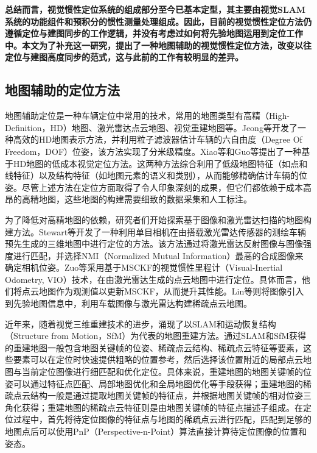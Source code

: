 \textbf{总结而言，视觉惯性定位系统的组成部分至今已基本定型，其主要由视觉SLAM系统的功能组件和预积分的惯性测量处理组成。因此，目前的视觉惯性定位方法仍遵循定位与建图同步的工作逻辑，并没有考虑过如何将先验地图运用到定位工作中。本文为了补充这一研究，提出了一种地图辅助的视觉惯性定位方法，改变以往定位与建图高度同步的范式，这与此前的工作有较明显的差异。}

\subsection{地图辅助的定位方法}
地图辅助定位是一种车辆定位中常用的技术，常用的地图类型有高精（High-Definition，HD）地图、激光雷达点云地图、视觉重建地图等。Jeong等\cite{jeong2020hdmi}开发了一种高效的HD地图表示方法，并利用粒子滤波器估计车辆的六自由度（Degree Of Freedom，DOF）位姿，该方法实现了分米级精度。Xiao等\cite{xiao2020monocular}和Guo等\cite{guo2021coarse}提出了一种基于HD地图的低成本视觉定位方法。这两种方法综合利用了低级地图特征（如点和线特征）以及结构特征（如地图元素的语义和类别），从而能够精确估计车辆的位姿。尽管上述方法在定位方面取得了令人印象深刻的成果，但它们都依赖于成本高昂的高精地图，这些地图的构建需要细致的数据采集和人工标注。

为了降低对高精地图的依赖，研究者们开始探索基于图像和激光雷达扫描的地图构建方法。Stewart等\cite{stewart2012laps}开发了一种利用单目相机在由搭载激光雷达传感器的测绘车辆预先生成的三维地图中进行定位的方法。该方法通过将激光雷达反射图像与图像强度进行匹配，并选择NMI（Normalized Mutual Information）最高的合成图像来确定相机位姿。Zuo等\cite{zuo2019visual}采用基于MSCKF的视觉惯性里程计（Visual-Inertial Odometry, VIO）技术，在由激光雷达生成的点云地图中进行定位。具体而言，他们将点云地图作为观测值以更新MSCKF，从而提升其性能。Lin等\cite{lin2021autonomous}则将图像引入到先验地图信息中，利用车载图像与激光雷达构建稀疏点云地图。

近年来，随着视觉三维重建技术的进步，涌现了以SLAM和运动恢复结构（Structure from Motion，SfM）\cite{schonberger2016structure}为代表的地图重建方法。通过SLAM和SfM获得的重建地图一般包含地图关键帧的位姿、稀疏点云结构、稀疏点云特征等要素，这些要素可以在定位时快速提供粗略的位置参考，然后选择该位置附近的局部点云地图与当前定位图像进行细匹配和优化定位。具体来说，重建地图的地图关键帧的位姿可以通过特征点匹配、局部地图优化和全局地图优化等手段获得；重建地图的稀疏点云结构一般是通过提取地图关键帧的特征点，并根据地图关键帧的相对位姿三角化获得；重建地图的稀疏点云特征则是由地图关键帧的特征点描述子组成。在定位过程中，首先将待定位图像的特征点与地图的稀疏点云进行匹配，匹配到足够的地图点后可以使用PnP（Perspective-n-Point）算法直接计算待定位图像的位置和姿态。

